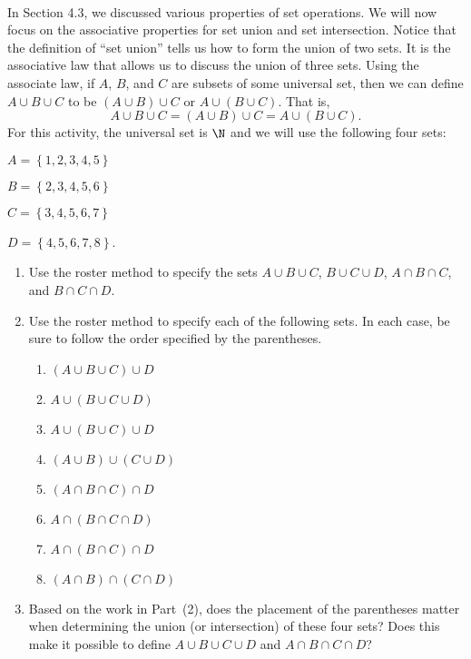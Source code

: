 \begin{previewactivity} \label{PA:foursets} \hfill
\\
In Section 4.3, we discussed various properties of set operations.  We will now focus on the associative properties for set union  and set intersection.  Notice that the definition of ``set union'' tells us how to form the union of two sets.  It is the associative law that allows us to discuss the union of three sets.  Using the associate law, if $A$, $B$, and $C$ are subsets of some universal set, then we can define $A \cup B \cup C$ to be 
$\left( A \cup B \right) \cup C$ or $A \cup \left( B \cup C \right)$.  That is,
\[
A \cup B \cup C = \left(A \cup B \right) \cup C = A \cup \left( B \cup C \right)\!.
\]
For this activity, the universal set is $\N$ and we will use the following four sets:
\begin{multicols}{2}

$A = \left\{ 1, 2, 3, 4, 5 \right\}$

$B = \left\{ 2, 3, 4, 5, 6 \right\}$

$C = \left\{ 3, 4, 5, 6, 7 \right\}$

$D = \left\{ 4, 5, 6, 7, 8 \right\}$.
\end{multicols}

\begin{enumerate}
\item Use the roster method to specify the sets $A \cup B \cup C$, $B \cup C \cup D$, 
$A \cap B \cap C$, and  $B \cap C \cap D$.

\item Use the roster method to specify each of the following sets.  In each case, be sure to follow the order specified by the parentheses.
\begin{multicols}{2}
\begin{enumerate}
\item $\left( A \cup B \cup C \right) \cup D$
\item $A \cup \left( B \cup C \cup D \right)$
\item $A \cup \left( B \cup C \right) \cup D$
\item $\left( A \cup B \right) \cup \left( C \cup D \right)$
\item $\left( A \cap B \cap C \right) \cap D$
\item $A \cap \left( B \cap C \cap D \right)$
\item $A \cap \left( B \cap C \right) \cap D$
\item $\left( A \cap B \right) \cap \left( C \cap D \right)$
\end{enumerate}
\end{multicols}
\item Based on the work in Part~(2), does the placement of the parentheses matter when determining the union (or intersection) of these four sets?  Does this make it possible to define $A \cup B \cup C \cup D$ and $A \cap B \cap C \cap D$?
\end{enumerate}
\end{previewactivity}
\hbreak


